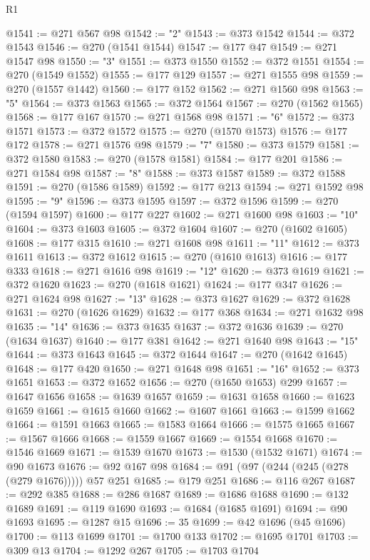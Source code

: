 \begin{lexlean}{R1}
\begin{coremodule}
@1541 := @271 @567 @98
@1542 := "2"
@1543 := @373 @1542
@1544 := @372 @1543
@1546 := @270 (@1541 @1544)
@1547 := @177 @47
@1549 := @271 @1547 @98
@1550 := "3"
@1551 := @373 @1550
@1552 := @372 @1551
@1554 := @270 (@1549 @1552)
@1555 := @177 @129
@1557 := @271 @1555 @98
@1559 := @270 (@1557 @1442)
@1560 := @177 @152
@1562 := @271 @1560 @98
@1563 := "5"
@1564 := @373 @1563
@1565 := @372 @1564
@1567 := @270 (@1562 @1565)
@1568 := @177 @167
@1570 := @271 @1568 @98
@1571 := "6"
@1572 := @373 @1571
@1573 := @372 @1572
@1575 := @270 (@1570 @1573)
@1576 := @177 @172
@1578 := @271 @1576 @98
@1579 := "7"
@1580 := @373 @1579
@1581 := @372 @1580
@1583 := @270 (@1578 @1581)
@1584 := @177 @201
@1586 := @271 @1584 @98
@1587 := "8"
@1588 := @373 @1587
@1589 := @372 @1588
@1591 := @270 (@1586 @1589)
@1592 := @177 @213
@1594 := @271 @1592 @98
@1595 := "9"
@1596 := @373 @1595
@1597 := @372 @1596
@1599 := @270 (@1594 @1597)
@1600 := @177 @227
@1602 := @271 @1600 @98
@1603 := "10"
@1604 := @373 @1603
@1605 := @372 @1604
@1607 := @270 (@1602 @1605)
@1608 := @177 @315
@1610 := @271 @1608 @98
@1611 := "11"
@1612 := @373 @1611
@1613 := @372 @1612
@1615 := @270 (@1610 @1613)
@1616 := @177 @333
@1618 := @271 @1616 @98
@1619 := "12"
@1620 := @373 @1619
@1621 := @372 @1620
@1623 := @270 (@1618 @1621)
@1624 := @177 @347
@1626 := @271 @1624 @98
@1627 := "13"
@1628 := @373 @1627
@1629 := @372 @1628
@1631 := @270 (@1626 @1629)
@1632 := @177 @368
@1634 := @271 @1632 @98
@1635 := "14"
@1636 := @373 @1635
@1637 := @372 @1636
@1639 := @270 (@1634 @1637)
@1640 := @177 @381
@1642 := @271 @1640 @98
@1643 := "15"
@1644 := @373 @1643
@1645 := @372 @1644
@1647 := @270 (@1642 @1645)
@1648 := @177 @420
@1650 := @271 @1648 @98
@1651 := "16"
@1652 := @373 @1651
@1653 := @372 @1652
@1656 := @270 (@1650 @1653) @299
@1657 := @1647 @1656
@1658 := @1639 @1657
@1659 := @1631 @1658
@1660 := @1623 @1659
@1661 := @1615 @1660
@1662 := @1607 @1661
@1663 := @1599 @1662
@1664 := @1591 @1663
@1665 := @1583 @1664
@1666 := @1575 @1665
@1667 := @1567 @1666
@1668 := @1559 @1667
@1669 := @1554 @1668
@1670 := @1546 @1669
@1671 := @1539 @1670
@1673 := @1530 (@1532 @1671)
@1674 := @90 @1673
@1676 := @92 @167 @98
@1684 := @91 (@97 (@244 (@245 (@278 (@279 @1676))))) @57 @251
@1685 := @179 @251
@1686 := @116 @267
@1687 := @292 @385
@1688 := @286 @1687
@1689 := @1686 @1688
@1690 := @132 @1689
@1691 := @119 @1690
@1693 := @1684 (@1685 @1691)
@1694 := @90 @1693
@1695 := @1287 @15
@1696 := 35
@1699 := @42 @1696 (@45 @1696)
@1700 := @113 @1699
@1701 := @1700 @133
@1702 := @1695 @1701
@1703 := @309 @13
@1704 := @1292 @267
@1705 := @1703 @1704

\end{coremodule}
\end{lexlean}
